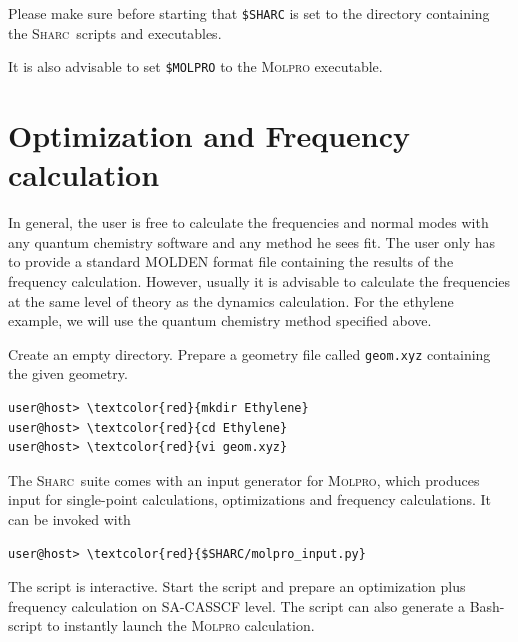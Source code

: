 \documentclass[a4paper,11pt,DIV=15,openany]{scrbook}
\newcommand{\sharc}{\textsc{Sharc}}
\newcommand{\ttt}[1]{\texttt{#1}}
\begin{document}
\begin{shaded}
  Please make sure before starting that \ttt{\$SHARC} is set to the directory containing the \sharc\ scripts and executables.

  It is also advisable to set \ttt{\$MOLPRO} to the \textsc{Molpro} executable.
\end{shaded}




\section{Optimization and Frequency calculation}

In general, the user is free to calculate the frequencies and normal modes with any quantum chemistry software and any method he sees fit. The user only has to provide a standard MOLDEN format file containing the results of the frequency calculation. However, usually it is advisable to calculate the frequencies at the same level of theory as the dynamics calculation. For the ethylene example, we will use the quantum chemistry method specified above. 

Create an empty directory. Prepare a geometry file called \ttt{geom.xyz} containing the given geometry.
\begin{Verbatim}[commandchars=\\\{\}]
user@host> \textcolor{red}{mkdir Ethylene}
user@host> \textcolor{red}{cd Ethylene}
user@host> \textcolor{red}{vi geom.xyz}
\end{Verbatim}

The \sharc\ suite comes with an input generator for \textsc{Molpro}, which produces input for single-point calculations, optimizations and frequency calculations. It can be invoked with
\begin{Verbatim}[commandchars=\\\{\}]
user@host> \textcolor{red}{$SHARC/molpro_input.py}
\end{Verbatim}
The script is interactive. Start the script and prepare an optimization plus frequency calculation on SA-CASSCF level. The script can also generate a Bash-script to instantly launch the \textsc{Molpro} calculation.
\end{document}
